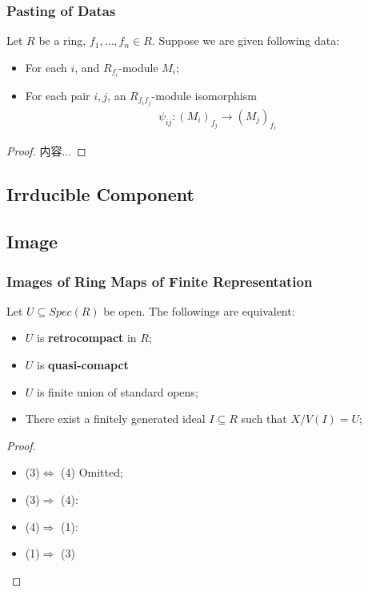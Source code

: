 \documentclass[Total.tex]{subfiles}
\begin{document}
			\subsubsection{Pasting of Datas}
			\begin{proposition}
				Let $R$ be a ring, $f_1,\dots,f_n\in R$. Suppose we are given following data:
				\begin{itemize}
					\item For each $i$, and $R_{f_i}$-module $M_i$;
					\item For each pair $i,j$, an $R_{f_if_j}$-module isomorphism
					\begin{gather*}
						\psi_{ij}:(M_i)_{f_j}\rightarrow (M_j)_{f_i}
					\end{gather*}
				\end{itemize}
			\end{proposition}
			\begin{proof}
				内容...
			\end{proof}
			\subsection{Irrducible Component}
			
			\subsection{Image}
			\subsubsection{Images of Ring Maps of Finite Representation}
			
			\begin{lemma}
				Let $U\subseteq Spec(R)$ be open. The followings are equivalent:
				
				\begin{itemize}
					\item $U$ is \textbf{retrocompact} in $R$;
					\item $U$ is \textbf{quasi-comapct}
					\item $U$ is finite union of standard opens;
					\item There exist a finitely generated ideal $I\subseteq R$ such that $X/V(I)=U$;
				\end{itemize}
			\end{lemma}
			
			\begin{proof}
				\begin{itemize}
					\item (3)$\Leftrightarrow$ (4) Omitted;
					\item (3)$\Rightarrow$ (4): 
					\item (4)$\Rightarrow$ (1):
					\item (1)$\Rightarrow$ (3)
				\end{itemize}
			\end{proof}
			
\end{document}
